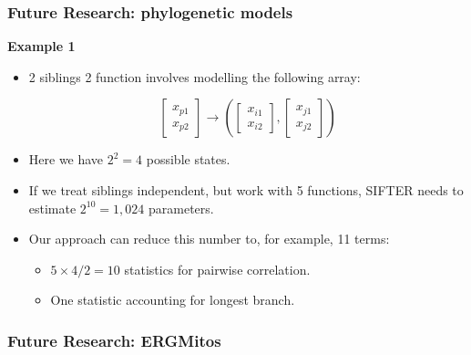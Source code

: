 \documentclass[aspectratio=169, 9pt]{beamer}\usepackage[]{graphicx}\usepackage[]{color}
\begin{document}
\begin{frame}[t]
\frametitle{Future Research: phylogenetic models}

\textbf{Example 1}\pause
\begin{itemize}[<+->]
\item 2 siblings 2 function involves modelling the following array:

$$
\left[\begin{array}{c}x_{p1}\\x_{p2}\end{array}\right] \to
\left(%
\left[\begin{array}{c} x_{i1} \\ x_{i2}\end{array}\right],%
\left[\begin{array}{c} x_{j1} \\ x_{j2}\end{array}\right]
\right)
$$
\item Here we have $2^2 = 4$ possible states.
\end{itemize}


\begin{itemize}[<+->]
\item If we treat siblings independent, but work with 5 functions, SIFTER needs
to estimate $2^{10} = 1,024$ parameters.

\item Our approach can reduce this number to, for example, 11 terms:
\begin{itemize}
\item $5\times 4 / 2 = 10$ statistics for pairwise correlation.
\item One statistic accounting for longest branch.
\end{itemize}
\end{itemize}

\end{frame}

\begin{frame}[t]
\frametitle{Future Research: ERGMitos}

\end{frame}

% 
\end{document}
